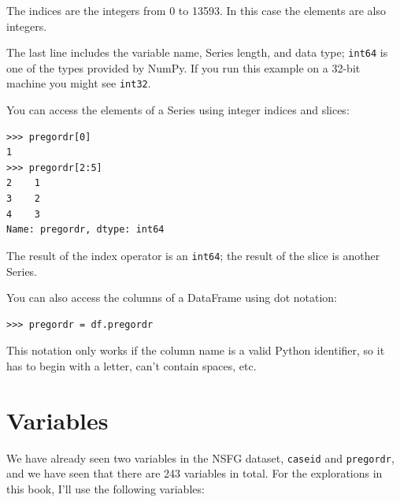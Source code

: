 \documentclass[12pt]{book}
\begin{document}
The indices are the integers from 0 to 13593.  In this case
the elements are also integers.

The last line includes the variable name, Series length, and data type;
{\tt int64} is one of the types provided by NumPy.  If you run
this example on a 32-bit machine you might see {\tt int32}.

You can access the elements of a Series using integer indices
and slices:

\begin{verbatim}
>>> pregordr[0]
1
>>> pregordr[2:5]
2    1
3    2
4    3
Name: pregordr, dtype: int64
\end{verbatim}

The result of the index operator is an {\tt int64}; the
result of the slice is another Series.

You can also access the columns of a DataFrame using dot notation:

\begin{verbatim}
>>> pregordr = df.pregordr
\end{verbatim}

This notation only works if the column name is a valid Python
identifier, so it has to begin with a letter, can't contain spaces, etc.


\section{Variables}

We have already seen two variables in the NSFG dataset, {\tt caseid}
and {\tt pregordr}, and we have seen that there are 243 variables in
total.  For the explorations in this book, I'll use the following
variables:
\end{document}
